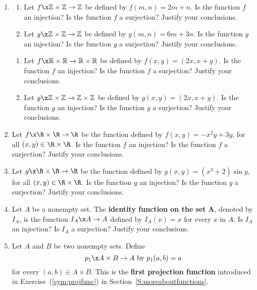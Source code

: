 \begin{enumerate}
\item \label{exer:sec63-10}
\begin{enumerate}
\item Let $f\x\mathbb{Z} \times \mathbb{Z} \to \mathbb{Z}$ be defined by  
$f( {m, n} ) = 2m + n$.  Is the function  $f$  an injection?  Is the function  $f$  a surjection?  Justify your conclusions.

\item Let $g\x\mathbb{Z} \times \mathbb{Z} \to \mathbb{Z}$ be defined by  
$g( {m, n} ) = 6m + 3n$.  Is the function  $g$  an injection?  Is the function  $g$  a surjection?  Justify your conclusions.
\end{enumerate}


\xitem \label{exer:sec63-11} \begin{enumerate} \item Let 
$f\x\mathbb{R} \times \mathbb{R} \to \mathbb{R} \times \mathbb{R}$ be defined by  
$f( {x, y} ) = ( {2x, x + y} )$. Is the function  $f$  an injection?  Is the function  $f$  a surjection?  Justify your conclusions.

  \item Let $g\x\mathbb{Z} \times \mathbb{Z} \to \mathbb{Z} \times \mathbb{Z}$ be defined by  $g( {x, y} ) = ( {2x, x + y} )$. Is the function  $g$  an injection?  Is the function  $g$  a surjection?  Justify your conclusions.
\end{enumerate}

\item Let $f\x\R \times \R \to \R$ be the function defined by $f (x, y ) = -x^2y+3y$, for all $(x, y ) \in \R \times \R$.  Is the function $f$ an injection?  Is the function $f$ a surjection?  Justify your conclusions.


\item Let $g\x\R \times \R \to \R$ be the function defined by 
$g (x, y ) = ( x^3 + 2) \sin y$, for all 
$(x, y ) \in \R \times \R$.  Is the function $g$ an injection?  Is the function $g$ a surjection?  Justify your conclusions.


\item Let  $A$  be a nonempty set.  The \textbf{identity function on the set}
%
  $\boldsymbol{A}$, denoted by  $I_A $, is the function  $I_A \x A \to A$ defined by  $I_A ( x ) = x$
for every  $x$  in  $A$.  Is  $I_A $ an injection?  Is  $I_A $ a surjection?  Justify your conclusions.

\item Let  $A$  and  $B$  be two nonempty sets.  Define  
\[
p_1 \x A \times B \to A \text{ by }  p_1 ( {a, b} ) = a
\]
for every  $( {a, b} ) \in A \times B$.  This is the \textbf{first projection function}
%
 introduced in Exercise~(\ref{sym:projfunc}) in Section~\ref{S:moreaboutfunctions}.


\end{enumerate}
